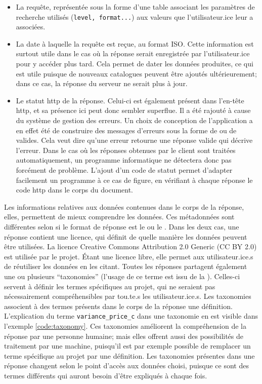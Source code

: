 \begin{itemize}
	\item La requête, représentée sous la forme d'une table associant les paramètres de recherche utilisés (\texttt{level, format...}) aux valeurs que l'utilisateur.ice leur a associées.
	\item La date à laquelle la requête est reçue, au format ISO. Cette information est surtout utile dans le cas où la réponse serait enregistrée par l'utilisateur.ice pour y accéder plus tard. Cela permet de dater les données produites, ce qui est utile puisque de nouveaux catalogues peuvent être ajoutés ultérieurement; dans ce cas, la réponse du serveur ne serait plus à jour.
	\item Le statut \gls{http} de la réponse. Celui-ci est également présent dans l'en-tête \gls{http}, et sa présence ici peut donc sembler superflue. Il a été rajouté à cause du système de gestion des erreurs. Un choix de conception de l'application a en effet été de construire des messages d'erreurs sous la forme de \json{} ou de \tei{} valides. Cela veut dire qu'une erreur retourne une réponse valide qui décrive l'erreur. Dans le cas où les réponses obtenues par le client sont traitées automatiquement, un programme informatique ne détectera donc pas forcément de problème. L'ajout d'un code de statut permet d'adapter facilement un programme à ce cas de figure, en vérifiant à chaque réponse le code \gls{http} dans le corps du document.
\end{itemize}

Les informations relatives aux données contenues dans le corps de la réponse, elles, permettent de mieux comprendre les données. Ces métadonnées sont différentes selon si le format de réponse est le \json{} ou le \tei{}. Dans les deux cas, une réponse contient une licence, qui définit de quelle manière les données peuvent être utilisées. La licence Creative Commons Attribution 2.0 Generic (CC BY 2.0) est utilisée par le projet. Étant une licence libre, elle permet aux utilisateur.ice.s de réutiliser les données en les citant. Toutes les réponses partagent également une ou plusieurs \enquote{taxonomies} (l'usage de ce terme est issu de la \tei{}). Celles-ci servent à définir les termes spécifiques au projet, qui ne seraient pas nécessairement compréhensibles par tou.te.s les utilisateur.ice.s. Les taxonomies associent à des termes présents dans le corps de la réponse une définition. L'explication du terme \texttt{variance\_price\_c} dans une taxonomie en \tei{} est visible dans l'exemple \ref{code:taxonomy}. Ces taxonomies améliorent la compréhension de la réponse par une personne humaine; mais elles offrent aussi des possibilités de traitement par une machine, puisqu'il est par exemple possible de remplacer un terme spécifique au projet par une définition. Les taxonomies présentes dans une réponse changent selon le point d'accès aux données choisi, puisque ce sont des termes différents qui auront besoin d'être expliqués à chaque fois.

